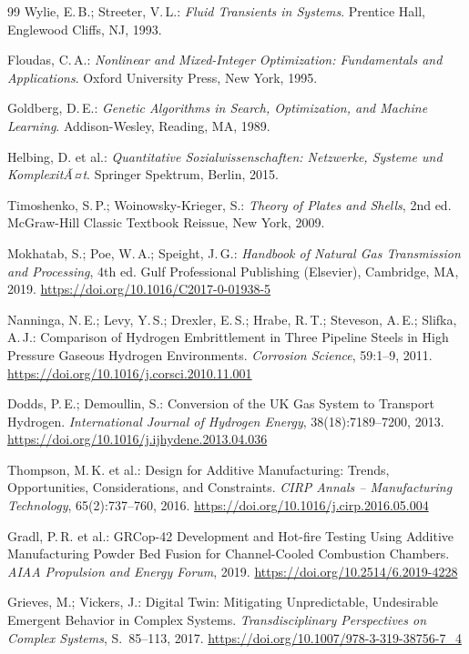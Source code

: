 ﻿\documentclass[12pt,a4paper,twoside]{article}
\theoremstyle{plain}
\theoremstyle{definition}
\theoremstyle{remark}
\begin{document}
\begin{thebibliography}{99}
Wylie, E.\,B.; Streeter, V.\,L.:
\textit{Fluid Transients in Systems}.
Prentice Hall, Englewood Cliffs, NJ, 1993.

Floudas, C.\,A.:
\textit{Nonlinear and Mixed-Integer Optimization: Fundamentals and Applications}.
Oxford University Press, New York, 1995.

Goldberg, D.\,E.:
\textit{Genetic Algorithms in Search, Optimization, and Machine Learning}.
Addison-Wesley, Reading, MA, 1989.

Helbing, D. et al.:
\textit{Quantitative Sozialwissenschaften: Netzwerke, Systeme und KomplexitÃ¤t}.
Springer Spektrum, Berlin, 2015.

Timoshenko, S.\,P.; Woinowsky-Krieger, S.:
\textit{Theory of Plates and Shells}, 2nd ed.
McGraw-Hill Classic Textbook Reissue, New York, 2009.

Mokhatab, S.; Poe, W.\,A.; Speight, J.\,G.:
\textit{Handbook of Natural Gas Transmission and Processing}, 4th ed.
Gulf Professional Publishing (Elsevier), Cambridge, MA, 2019.
\url{https://doi.org/10.1016/C2017-0-01938-5}

Nanninga, N.\,E.; Levy, Y.\,S.; Drexler, E.\,S.; Hrabe, R.\,T.;
Steveson, A.\,E.; Slifka, A.\,J.:
Comparison of Hydrogen Embrittlement in Three Pipeline Steels in High Pressure
Gaseous Hydrogen Environments.
\textit{Corrosion Science}, 59:1--9, 2011.
\url{https://doi.org/10.1016/j.corsci.2010.11.001}

Dodds, P.\,E.; Demoullin, S.:
Conversion of the UK Gas System to Transport Hydrogen.
\textit{International Journal of Hydrogen Energy}, 38(18):7189--7200, 2013.
\url{https://doi.org/10.1016/j.ijhydene.2013.04.036}

Thompson, M.\,K. et al.:
Design for Additive Manufacturing: Trends, Opportunities, Considerations,
and Constraints.
\textit{CIRP Annals -- Manufacturing Technology}, 65(2):737--760, 2016.
\url{https://doi.org/10.1016/j.cirp.2016.05.004}

Gradl, P.\,R. et al.:
GRCop-42 Development and Hot-fire Testing Using Additive Manufacturing Powder
Bed Fusion for Channel-Cooled Combustion Chambers.
\textit{AIAA Propulsion and Energy Forum}, 2019.
\url{https://doi.org/10.2514/6.2019-4228}

Grieves, M.; Vickers, J.:
Digital Twin: Mitigating Unpredictable, Undesirable Emergent Behavior in
Complex Systems.
\textit{Transdisciplinary Perspectives on Complex Systems}, S.\ 85--113, 2017.
\url{https://doi.org/10.1007/978-3-319-38756-7_4}


\end{thebibliography}
\end{document}
